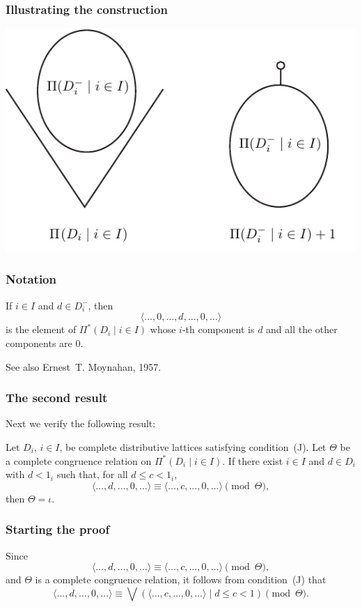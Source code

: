 \documentclass{beamer}
\begin{document}
\begin{frame}
\frametitle{Illustrating the construction}

\centering\includegraphics{products}
\end{frame}

\begin{frame}
\frametitle{Notation}

If $i \in I$ and $d \in D_{i}^{-}$, then
\[
  \langle \ldots, 0, \ldots, d, \ldots, 0, \ldots \rangle
\]
is the element of $\Pi^{*} ( D_{i} \mid i \in I )$ whose 
$i$-th component is $d$ and all the other components 
are $0$.

See also Ernest~T. Moynahan, 1957.
\end{frame}

\begin{frame}
\frametitle{The second result}

Next we verify the following result:

\begin{theorem}
Let $D_{i}$, $i \in I$, be complete distributive 
lattices satisfying condition~\textup{(J)}.  
Let $\Theta$ be a complete congruence relation on 
$\Pi^{*} ( D_{i} \mid i \in I )$. 
If there exist $i \in I$ and $d \in D_{i}$ with 
$d < 1_{i}$ such that, for all $d \leq c < 1_{i}$, 
\begin{equation*} 
   \langle \ldots, d, \ldots, 0, \ldots \rangle \equiv 
   \langle \ldots, c, \ldots, 0, \ldots \rangle 
   \pmod{\Theta}, 
\end{equation*}
then $\Theta = \iota$.
\end{theorem}

\end{frame}

\begin{frame}
\frametitle{Starting the proof}

Since 
\begin{equation*}
\langle \ldots, d, \ldots, 0, \ldots \rangle \equiv 
\langle \ldots, c, \ldots, 0, \ldots \rangle 
\pmod{\Theta}, 
\end{equation*}
and $\Theta$ is a complete congruence relation, 
it follows from condition~(J) that
\begin{equation*}
 \langle \ldots, d, \ldots, 0, \ldots \rangle \equiv
 \bigvee ( \langle \ldots, c, \ldots, 0, \ldots \rangle 
 \mid d \leq c < 1 ) \pmod{\Theta}. 
\end{equation*}
\end{frame}
\end{document}
